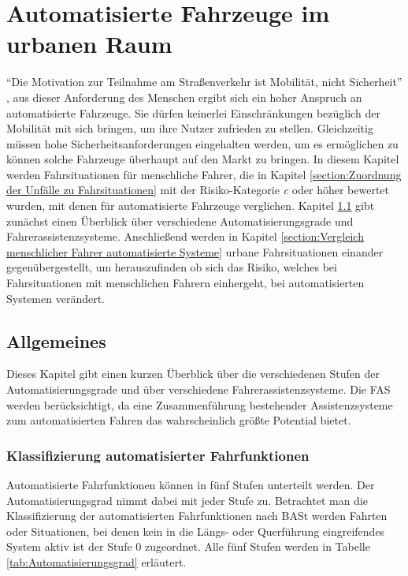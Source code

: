 
\chapter{Automatisierte Fahrzeuge im urbanen Raum}\label{chapter:automatisiertes Fahren}
\enquote{Die Motivation zur Teilnahme am Straßenverkehr ist Mobilität, nicht Sicherheit} \parencite[S. 146]{Huguenin.2017}, aus dieser Anforderung des Menschen ergibt sich ein hoher Anspruch an automatisierte Fahrzeuge. Sie dürfen keinerlei Einschränkungen bezüglich der Mobilität mit sich bringen, um ihre Nutzer zufrieden zu stellen. Gleichzeitig müssen hohe Sicherheitsanforderungen eingehalten werden, um es ermöglichen zu können solche Fahrzeuge überhaupt auf den Markt zu bringen. In diesem Kapitel werden Fahrsituationen für menschliche Fahrer, die in Kapitel \ref{section:Zuordnung der Unfälle zu Fahrsituationen} mit der Risiko-Kategorie \textit{c} oder höher bewertet wurden, mit denen für automatisierte Fahrzeuge verglichen. Kapitel \ref{section:Allgemeines} gibt zunächst einen Überblick über verschiedene Automatisierungsgrade und Fahrerassistenzsysteme. Anschließend werden in Kapitel \ref{section:Vergleich menschlicher Fahrer automatisierte Systeme} urbane Fahrsituationen einander gegenübergestellt, um herauszufinden ob sich das Risiko, welches bei Fahrsituationen mit menschlichen Fahrern einhergeht, bei automatisierten Systemen verändert.

\section{Allgemeines}\label{section:Allgemeines}
Dieses Kapitel gibt einen kurzen Überblick über die verschiedenen Stufen der Automatisierungsgrade und über verschiedene Fahrerassistenzsysteme. Die FAS werden berücksichtigt, da eine Zusammenführung bestehender Assistenzsysteme zum automatisierten Fahren das wahrscheinlich größte Potential bietet.

\subsection{Klassifizierung automatisierter Fahrfunktionen}
Automatisierte Fahrfunktionen können in fünf Stufen unterteilt werden. Der Automatisierungsgrad nimmt dabei mit jeder Stufe zu. Betrachtet man die Klassifizierung der automatisierten Fahrfunktionen nach \ac{BASt} werden Fahrten oder Situationen, bei denen kein in die Längs- oder Querführung eingreifendes System aktiv ist der Stufe 0 zugeordnet. Alle fünf Stufen werden in Tabelle \ref{tab:Automatisierungsgrad} erläutert.


